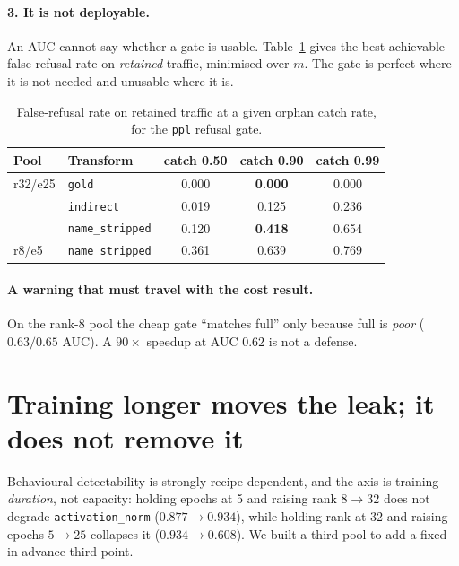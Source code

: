 \documentclass{article}
\begin{document}
\paragraph{3. It is not deployable.} An AUC cannot say whether a gate is usable.
Table~\ref{tab:fpr} gives the best achievable false-refusal rate on \emph{retained} traffic,
minimised over $m$. The gate is perfect where it is not needed and unusable where it is.

\begin{table}[ht]
  \caption{False-refusal rate on retained traffic at a given orphan catch rate, for the
  \texttt{ppl} refusal gate.}
  \label{tab:fpr}
  \centering
  \small
  \begin{tabular}{@{}llccc@{}}
    \toprule
    Pool & Transform & catch 0.50 & catch 0.90 & catch 0.99 \\
    \midrule
    r32/e25 & \texttt{gold}            & 0.000 & \textbf{0.000} & 0.000 \\
            & \texttt{indirect}        & 0.019 & 0.125 & 0.236 \\
            & \texttt{name\_stripped}  & 0.120 & \textbf{0.418} & 0.654 \\
    r8/e5   & \texttt{name\_stripped}  & 0.361 & 0.639 & 0.769 \\
    \bottomrule
  \end{tabular}
\end{table}

\paragraph{A warning that must travel with the cost result.} On the rank-8 pool the cheap gate
``matches full'' only because full is \emph{poor} ($0.63/0.65$ AUC). A $90\times$ speedup at AUC
$0.62$ is not a defense.

\section{Training longer moves the leak; it does not remove it}
\label{app:duration}

Behavioural detectability is strongly recipe-dependent, and the axis is training \emph{duration},
not capacity: holding epochs at 5 and raising rank $8 \to 32$ does not degrade
\texttt{activation\_norm} ($0.877 \to 0.934$), while holding rank at 32 and raising epochs $5 \to
25$ collapses it ($0.934 \to 0.608$). We built a third pool to add a fixed-in-advance third point.
\end{document}
